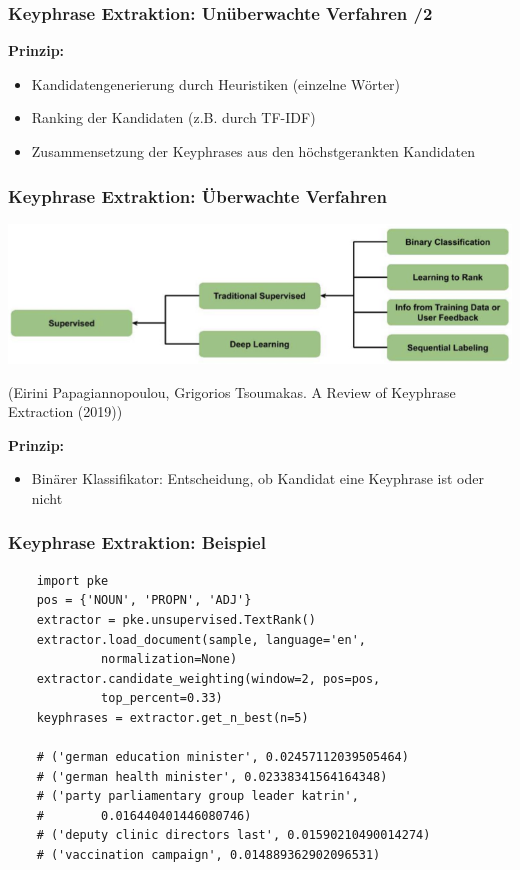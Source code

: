  
\begin{frame}
    \frametitle{Keyphrase Extraktion: Unüberwachte Verfahren /2}

    \textbf{Prinzip:}
    \begin{itemize}
        \item Kandidatengenerierung durch Heuristiken (einzelne Wörter)
        \item Ranking der Kandidaten (z.B. durch TF-IDF)
        \item Zusammensetzung der Keyphrases aus den höchstgerankten Kandidaten
    \end{itemize}
\end{frame}
    
 

\begin{frame}
    \frametitle{Keyphrase Extraktion: Überwachte Verfahren}

    \includegraphics[width=0.95\linewidth]{fig8/kpe_supervised}

    {\tiny (Eirini Papagiannopoulou, Grigorios Tsoumakas. A Review of Keyphrase Extraction (2019))}

    \textbf{Prinzip:}
\begin{itemize}
\item Binärer Klassifikator: Entscheidung, ob Kandidat eine Keyphrase ist oder nicht
\end{itemize}
\end{frame}
    
 
\begin{frame}[fragile]
    \frametitle{Keyphrase Extraktion: Beispiel}
   
   \begin{verbatim}
    import pke
    pos = {'NOUN', 'PROPN', 'ADJ'}
    extractor = pke.unsupervised.TextRank()
    extractor.load_document(sample, language='en', 
             normalization=None)
    extractor.candidate_weighting(window=2, pos=pos, 
             top_percent=0.33)
    keyphrases = extractor.get_n_best(n=5)

    # ('german education minister', 0.02457112039505464)
    # ('german health minister', 0.02338341564164348)
    # ('party parliamentary group leader katrin', 
    #        0.016440401446080746)
    # ('deputy clinic directors last', 0.01590210490014274)
    # ('vaccination campaign', 0.014889362902096531)
\end{verbatim}

    \end{frame}

